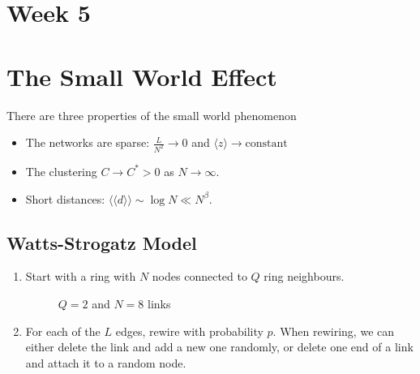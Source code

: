 \documentclass[12pt]{article}
\theoremstyle{definition}
\begin{document}
\newpage

\section*{Week 5}

\section{The Small World Effect}

There are three properties of the small world phenomenon
\begin{itemize}
    \item The networks are sparse: $\frac{L}{N^2} \to 0$ and $\langle z\rangle \to \mathrm{constant}$
    \item The clustering $C\to C^* >0$ as $N\to \infty$.
    \item Short distances: $\langle \langle d\rangle \rangle \sim \log N \ll N^{\beta}$.
\end{itemize}

\subsection{Watts-Strogatz Model}

\begin{enumerate}
    \item Start with a ring with $N$ nodes connected to $Q$ ring neighbours.
    \begin{figure}[h]
        \centering
\caption{$Q=2$ and $N=8$ links}
    \end{figure}
    \item For each of the $L$ edges, rewire with probability $p$. When rewiring, we can either delete the link and add a new one randomly, or delete one end of a link and attach it to a random node. 
\end{enumerate}
\end{document}
